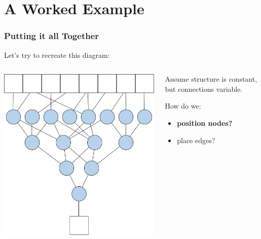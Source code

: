 \mode*		%

\section{A Worked Example}

\begin{frame}
	\frametitle{Putting it all Together}
	Let's try to recreate this diagram:

	\begin{columns}[T]
		\begin{column}{.5\textwidth}
			\centering
			\includegraphics[width=\textwidth]{figures/specification}
		\end{column}
		\begin{column}{.5\textwidth}
			Assume structure is constant, but connections variable.

			How do we:
			\begin{itemize}
				\item \textbf{position nodes?}
				\item place edges?
			\end{itemize}
		\end{column}
	\end{columns}
\end{frame}
\mode*

